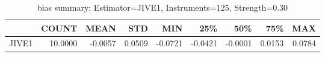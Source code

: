 \begin{table}[ht]
\centering
\caption{bias summary: Estimator=JIVE1, Instruments=125, Strength=0.30}
\begin{tabular}{lrrrrrrrr}
\toprule
 & COUNT & MEAN & STD & MIN & 25\% & 50\% & 75\% & MAX \\
\midrule
JIVE1 & 10.0000 & -0.0057 & 0.0509 & -0.0721 & -0.0421 & -0.0001 & 0.0153 & 0.0784 \\
\bottomrule
\end{tabular}
\end{table}
